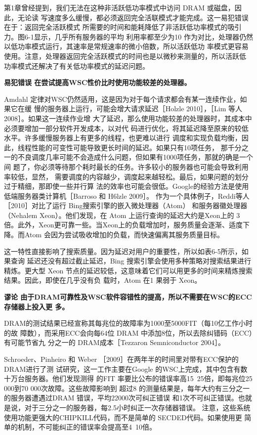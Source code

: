 第1章曾经提到，我们无法在这种非活跃低功率模式中访问 DRAM 或磁盘，因此，无论读
写速度多么缓慢，都必须返回完全活联模式才能完成。这一易犯错误在于：返回完全活跃模式
所需要的时间和能耗降低了非活跃低功率模式的吸引力。图6-1显示，几乎所有服务器的平均
利用率都至少为10%
作为对比，处理器仍然以低功率模式运行，其速率是常规速率的微小倍数，所以活跃低功
率模式更容易使用。注意，处理器返回完全活跃模式的时间也是以微秒来测量的，所以活跃低
功率模式还解决了有关低功率模式的延迟问题。

\textbf{易犯错误 在尝试提高WSC性价比时使用功能较差的处理器。}

Amdahl 定律对WSC仍然适用，这是因为对于每个请求都会有某一连续作业，如果它在缓
慢的服务器上运行，可能会增大请求延迟［Holzle 2010］，［Lim 等人2008］。如果这一连续作业增
大了延迟，那么使用功能较差的处理器时，其成本中必须要增加一部分软件开发成本，以对代
码进行优化，将其延迟降至原来的较低水平。许多缓慢服务器上有更多的线程，也更难以进行
调度和实现负载均衡，因此，线程性能的可变性可能导致更长时间的延迟。如果只有10项任务，
那千分之一的不良调度几率可能不会造成什么问题，但如果有1000项任务，那就的确是一个间
题了，你必须等待那个耗时最长的任务。许多较小的服务器也可能会导致利用率较低，显然，
需要调度的内容越少，调度起来越轻松。最后，如果问题的划分过于精细，那即使一些并行算
法的效率也可能会很低。Google的经验方法是使用低端服务器类计算机［Barroso 和 H6lzle 2009］。
作为一个具体例子，Reddi等人［2010］对比了运行 Bing搜索引擎的嵌入微处理器（Atom）
和服务器徽处理器（Nehalem Xeon）。他们发现，在 Atom 上运行查询的延迟大约是Xeon上的
3倍。此外，Xeon更可靠一些。当Xeon上的负载增加时，服务质量会逐渐、适度下降。而Atom
会因为尝试吸收增加的负载，而快速偏离其服务质量目标。

这一特性直接影响了搜索质量。因为延迟对用户的重要性，所以如表6-5所示，如果查询
延迟还没有超过截止延迟，Bing 搜索引擎会使用多种策略对搜索结果进行精炼。更大型 Xeon
节点的延迟较低，这意味着它们可以用更多的时间来精炼搜索结果。因此，即使在几乎没有负
载时，Atom 在1%
果弱于 Xeon。

\textbf{谬论 由于DRAM可靠性及WSC软件容错性的提高，所以不需要在WSC的ECC存储器上投入更
多。}

DRAM的测试结果已经宣称其每兆位的故障率为1000至5000FIT（每10亿工作小时的故
障数），而采用ECC会向每64位 DRAM 中添加8位，所以去除纠错码（ECC）有可能节省九
分之一的 DRAM成本［Tezzaron Semniconductor 2004］。

Schroeder、Pinheiro 和 Weber ［2009］在两年半的时间里对带有ECC保护的 DRAM进行了测
试研究，这一工作主要在Google 的WSC上完成，其中包含有数十万台服务器。他们发现测得
的FIT 率要比公布的错误率高15~25倍，即每兆位25 000到70 000次故障。这些故障影响到
超过8%
的测量结果是，每年大约有三分之一的服务器遭遇过DRAM 错误，平均22000次可纠正错误
和1次不可纠正错误。也就是说，对于三分之一的服务器，每2.5小时纠正一次存储器错误。
注意，这些系统使用功能更强大的CHIPKILL代码，而不是简单的 SECDED代码。如果使用更
简单的机制，不可能纠正的错误率会提高至4~10倍。

